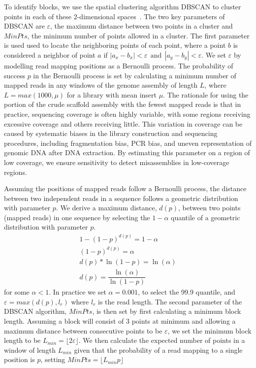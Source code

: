 \documentclass{bioinfo}
\begin{document}
To identify blocks, we use the spatial clustering algorithm DBSCAN 
to cluster points in each of these 2-dimensional spaces~\citep{DBSCAN}. The two key parameters of DBSCAN are $\varepsilon$, the maximum distance between 
two points in a cluster and $MinPts$, the minimum number of points allowed in a cluster. The first parameter is used used to locate 
the neighboring points of each point, where a point $b$ is considered a neighbor of point $a$ if $|a_x - b_x| < \varepsilon 
~~\mbox{and}~~ |a_y - b_y| < \varepsilon$. We set $\varepsilon$ by modelling read mapping positions as a Bernoulli process. 
The probability of success $p$ in the Bernoulli process is set by calculating a minimum number of mapped reads
in any windows of the genome assembly of length $L$, where $L = max(1000,\mu)$ for a library with mean insert $\mu$. 
The rationale for using the portion of the crude scaffold assembly with the fewest mapped reads is that in practice, sequencing
coverage is often highly variable, with some regions receiving excessive coverage and others receiving little. This variation
in coverage can be caused by systematic biases in the library construction and sequencing procedures, including fragmentation bias,
PCR bias, and uneven representation of genomic DNA after DNA extraction. By estimating this parameter on a region of low
coverage, we ensure sensitivity to detect misassemblies in low-coverage regions.

Assuming the positions of mapped reads  
follow a Bernoulli process, the distance between two independent reads in a sequence follows a geometric distribution with parameter $p$.
We derive a maximum distance, $d(p)$, between two points (mapped reads) in one sequence by selecting the
$1-\alpha$ quantile of a geometric distribution with parameter $p$.
\begin{eqnarray}
	1 - (1-p)^{d(p)} = 1-\alpha \nonumber \\
	(1-p)^{d(p)} = \alpha  \nonumber \\ 
	d(p)*\ln(1-p) = \ln(\alpha)  \nonumber \\
	d(p) = \dfrac{\ln(\alpha)}{\ln(1-p)} 
\end{eqnarray} 
for some $\alpha < 1$. In practice we set $\alpha = 0.001$, to select the 99.9 quantile, and $\varepsilon = max(d(p),l_r)$ where $l_r$ is the read length.
The second parameter of the DBSCAN algorithm, $MinPts$, is then set by first calculating a minimum block length. Assuming a block will consist of
3 points at minimum and allowing a maximum distance between consecutive points to be $\varepsilon$, we set the minimum block length to be 
$L_{min} = \lfloor2\varepsilon\rfloor$. We then calculate the expected number of points in a window of length $L_{min}$ given that the probability of
a read mapping to a single position is $p$, setting $MinPts = \lfloor{L_{min}p}\rfloor$
\end{document}
